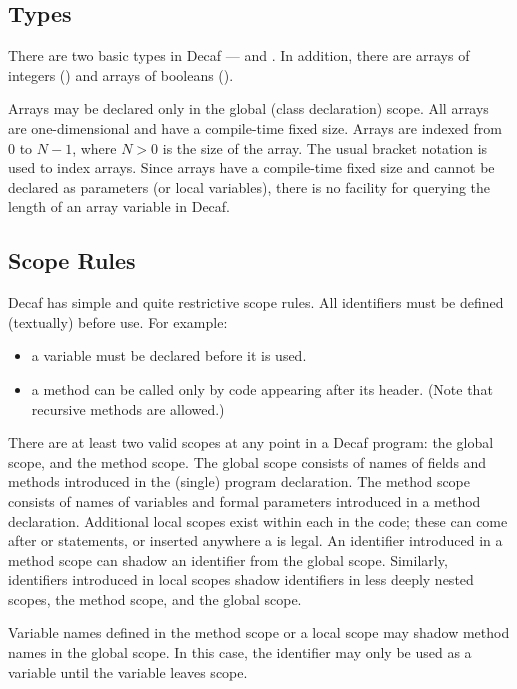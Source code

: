 \subsection*{Types}

There are two basic types in Decaf ---  and
.  In addition, there are arrays of integers () and arrays of booleans ().

Arrays may be declared only in the global (class declaration) scope.
All arrays are one-dimensional and have a compile-time fixed size.
Arrays are indexed from 0 to $N-1$, where $N > 0$ is the size of the
array.  The usual bracket notation is used to index arrays.  Since
arrays have a compile-time fixed size and cannot be declared as
parameters (or local variables), there is no facility for querying the
length of an array variable in Decaf.

\subsection*{Scope Rules}

Decaf has simple and quite restrictive scope rules.  All
identifiers must be defined (textually) before use.  For example:

 \begin{itemize}
  \item a variable must be declared before it is used.
  \item a method can be called only by code appearing after its header.
(Note that recursive methods are allowed.)
 \end{itemize}

There are at least two valid scopes at any point in a
Decaf program: the global scope, and the method
scope.  The global scope consists of names of fields and methods
introduced in the (single) program declaration.  The
method scope consists of names of variables and formal parameters
introduced in a method declaration.  Additional local scopes exist within
each  in the code; these can come after  or 
statements, or inserted anywhere a  is
legal.  An identifier introduced in a method scope can shadow an
identifier from the global scope.  Similarly, identifiers introduced
in local scopes shadow identifiers in less deeply nested scopes, the
method scope, and the global scope.

Variable names defined in the method scope or a local scope may
shadow method names in the global scope.  In this case, the
identifier may only be used as a variable until the variable leaves
scope.

